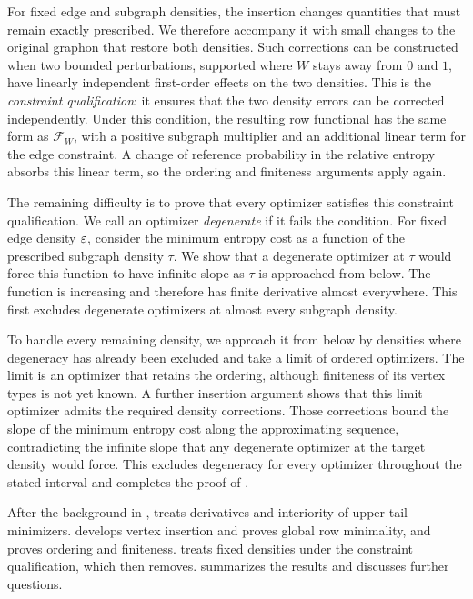 For fixed edge and subgraph densities, the insertion changes quantities
that must remain exactly prescribed. We therefore accompany it with
small changes to the original graphon that restore both densities.
Such corrections can be constructed when two bounded perturbations,
supported where $W$ stays away from $0$ and $1$, have linearly independent
first-order effects on the two densities. This is the \emph{constraint
qualification}: it ensures that the two density errors can be corrected
independently. Under this condition, the resulting row functional has
the same form as $\mathcal F_W$, with a positive subgraph multiplier and
an additional linear term for the edge constraint. A change of reference
probability in the relative entropy absorbs this linear term, so the
ordering and finiteness arguments apply again.

The remaining difficulty is to prove that every optimizer satisfies
this constraint qualification. We call an optimizer \emph{degenerate}
if it fails the condition. For fixed edge density $\varepsilon$, consider the
minimum entropy cost as a function of the prescribed subgraph density
$\tau$. We show that a degenerate optimizer at $\tau$ would force this
function to have infinite slope as $\tau$ is approached from below.
The function is increasing and therefore has finite derivative almost
everywhere. This first excludes degenerate optimizers at almost every
subgraph density.

To handle every remaining density, we approach it from below by densities
where degeneracy has already been excluded and take a limit of ordered
optimizers. The limit is an optimizer that retains the ordering, although
finiteness of its vertex types is not yet known. A further insertion
argument shows that this limit optimizer admits the required density
corrections. Those corrections bound the slope of the minimum entropy
cost along the approximating sequence, contradicting the infinite slope
that any degenerate optimizer at the target density would force. This
excludes degeneracy for every optimizer throughout the stated interval
and completes the proof of .

After the background in ,
 treats derivatives and interiority of
upper-tail minimizers.  develops
vertex insertion and proves global row minimality, and
 proves ordering and finiteness.
 treats fixed densities under the constraint
qualification, which  then removes.
 summarizes the results and discusses further questions.
